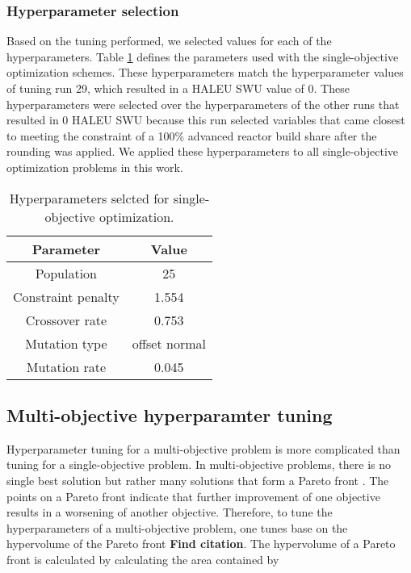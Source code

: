 \subsubsection{Hyperparameter selection}
Based on the tuning performed, we selected values for each of the 
hyperparameters. Table \ref{tab:soga_parameters} defines the 
parameters used with the single-objective optimization schemes. These 
hyperparameters match the hyperparameter values of tuning run 29, 
which resulted in a \gls{HALEU} \gls{SWU} value of 0. These hyperparameters 
were selected over the hyperparameters of the other runs that resulted in 
0 \gls{HALEU} \gls{SWU} because this run selected variables that came closest to 
meeting the constraint of a 100\% advanced reactor build share after the rounding 
was applied. We applied these hyperparameters to all single-objective 
optimization problems in this work. 

\begin{table}
    \centering
    \caption{Hyperparameters selcted for single-objective optimization.}
    \label{tab:soga_parameters}
    \begin{tabular}{c c}
        \hline
        Parameter & Value \\
        \hline
        Population & 25 \\
        Constraint penalty & 1.554\\
        Crossover rate & 0.753\\
        Mutation type & offset normal\\
        Mutation rate & 0.045\\
        \hline
    \end{tabular}
\end{table}

\subsection{Multi-objective hyperparamter tuning}
Hyperparameter tuning for a multi-objective problem is more complicated 
than tuning for a single-objective problem. In multi-objective 
problems, there is no single best solution but rather many solutions 
that form a Pareto front \cite{adams_dakota_2019}. The points on a 
Pareto front indicate that further improvement of one objective 
results in a worsening of another objective. Therefore, to tune the 
hyperparameters of a multi-objective problem, one tunes base on the 
hypervolume of the Pareto front \textbf{Find citation}. The 
hypervolume of a Pareto front is calculated by calculating the area 
contained by 

